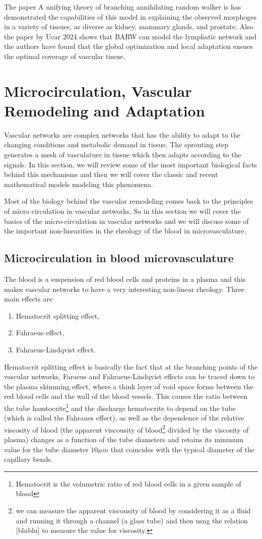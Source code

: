 \documentclass[10pt,a4paper,twocolumn]{article}
\begin{document}
	The paper A unifying theory of branching annihilating random walker is has demonstrated the capabilities of this model in explaining the observed morphoges in a variety of tissues, as diverse as kidney, mammary glands, and prostate. Also the paper by Ucar 2024 shows that BARW can model the lymphatic network and the authors have found that the global optimization and local adaptation ensues the optimal coverage of vascular tissue. 
	
	
	\section{Microcirculation, Vascular Remodeling and Adaptation}
	Vascular networks are complex networks that has the ability to adapt to the changing conditions and metabolic demand in tissue. The sprouting step generates a mesh of vasculature in tissue which then adapts according to the signals. In this section, we will review some of the most important biological facts behind this mechanisms and then we will cover the classic and recent mathematical models modeling this phenomena.
	
	Most of the biology behind the vascular remodeling comes back to the principles of micro circulation in vascular networks. So in this section we will cover the basics of the micro-circulation in vascular networks and we will discuss some of the important non-linearities in the rheology of the blood in microvasculature.
	
	\subsection{Microcirculation in blood microvasculature}
	The blood is a suspension of red blood cells and proteins in a plasma and this makes vascular networks to have a very interesting non-linear rheology. Three main effects are 
	\begin{enumerate}
		\item Hematocrit splitting effect,
		\item Fahraeus effect,
		\item Fahraeus-Lindqvist effect.
	\end{enumerate}
	Hematocrit splitting effect is basically the fact that at the branching points of the vascular networks,  Faraeus and Fahraeus-Lindqvist effects can be traced down to the plasma skimming effect, where a think layer of void space forms between the red blood cells and the wall of the blood vessels. This causes the ratio between the tube hamtocrite\footnote{Hematocrit is the volumetric ratio of red blood cells in a given sample of blood} and the discharge hematocrite to depend on the tube (which is called the Fahraues effect), as well as the dependence of the relative viscosity of blood (the apparent viscousity of blood\footnote{we can measure the apparent viscousity of blood by considering it as a fluid and running it through a channel (a glass tube) and then usng the relation [blublu] to measure the value for viscosity.} divided by the viscosity of plasma) changes as a function of the tube diameters and retains its minimum value for the tube diameter $ 10\mu m $ that coincides with the typical diameter of the capillary bends.
	
\end{document}
